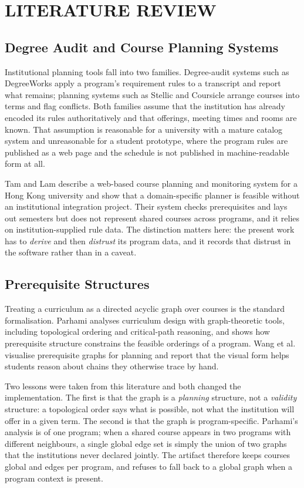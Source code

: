 \chapter{LITERATURE REVIEW}

\label{ch:literature}

\section{Degree Audit and Course Planning Systems}

Institutional planning tools fall into two families. Degree-audit systems such as DegreeWorks
apply a program's requirement rules to a transcript and report what remains; planning systems such
as Stellic and Coursicle arrange courses into terms and flag conflicts. Both families assume that
the institution has already encoded its rules authoritatively and that offerings, meeting times and
rooms are known. That assumption is reasonable for a university with a mature catalog system and
unreasonable for a student prototype, where the program rules are published as a web page and the
schedule is not published in machine-readable form at all.

Tam and Lam \cite{tam2019} describe a web-based course planning and monitoring system for a Hong
Kong university and show that a domain-specific planner is feasible without an institutional
integration project. Their system checks prerequisites and lays out semesters but does not
represent shared courses across programs, and it relies on institution-supplied rule data. The
distinction matters here: the present work has to {\em derive} and then {\em distrust} its program
data, and it records that distrust in the software rather than in a caveat.

\section{Prerequisite Structures}

Treating a curriculum as a directed acyclic graph over courses is the standard formalisation.
Parhami \cite{parhami2015} analyses curriculum design with graph-theoretic tools, including
topological ordering and critical-path reasoning, and shows how prerequisite structure constrains
the feasible orderings of a program. Wang et al.\ \cite{wang2020} visualise prerequisite graphs
for planning and report that the visual form helps students reason about chains they otherwise
trace by hand.

Two lessons were taken from this literature and both changed the implementation. The first is that
the graph is a {\em planning} structure, not a {\em validity} structure: a topological order says
what is possible, not what the institution will offer in a given term. The second is that the graph
is program-specific. Parhami's analysis is of one program; when a shared course appears in two
programs with different neighbours, a single global edge set is simply the union of two graphs that
the institutions never declared jointly. The artifact therefore keeps courses global and edges
per program, and refuses to fall back to a global graph when a program context is present.

